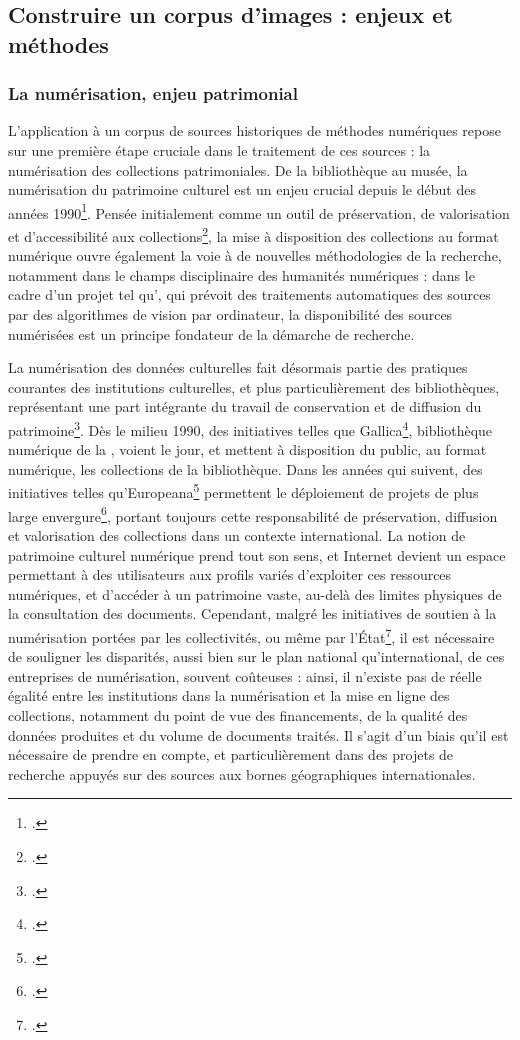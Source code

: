 
\subsection{Construire un corpus d’images : enjeux et méthodes}
    \subsubsection{La numérisation, enjeu patrimonial}
	L'application à un corpus de sources historiques de méthodes numériques repose sur une première étape cruciale dans le traitement de ces sources : la numérisation des collections patrimoniales. De la bibliothèque au musée, la numérisation du patrimoine culturel est un enjeu crucial depuis le début des années 1990\footcite{baujardNumerisationPatrimoineCulturel2017}. Pensée initialement comme un outil de préservation, de valorisation et d'accessibilité aux collections\footcite{richardProgrammeNumerisationBibliotheque1993}, la mise à disposition des collections au format numérique ouvre également la voie à de nouvelles méthodologies de la recherche, notamment dans le champs disciplinaire des humanités numériques : dans le cadre d'un projet tel qu'\eida, qui prévoit des traitements automatiques des sources par des algorithmes de vision par ordinateur, la disponibilité des sources numérisées est un principe fondateur de la démarche de recherche. 
	
	La numérisation des données culturelles fait désormais partie des pratiques courantes des institutions culturelles, et plus particulièrement des bibliothèques, représentant une part intégrante du travail de conservation et de diffusion du patrimoine\footcite{claerrModeEmploi2017}. Dès le milieu 1990, des initiatives telles que Gallica\footcite{Gallica}, bibliothèque numérique de la \bnf, voient le jour, et mettent à disposition du public, au format numérique, les collections de la bibliothèque. Dans les années qui suivent, des initiatives telles qu'Europeana\footcite{Europeana} permettent le déploiement de projets de plus large envergure\footcite{claerrModeEmploi2017}, portant toujours cette responsabilité de préservation, diffusion et valorisation des collections dans un contexte international. La notion de patrimoine culturel numérique prend tout son sens, et Internet devient un espace permettant à des utilisateurs aux profils variés d'exploiter ces ressources numériques, et d'accéder à un patrimoine vaste, au-delà des limites physiques de la consultation des documents. Cependant, malgré les initiatives de soutien à la numérisation portées par les collectivités, ou même par l'État\footcite{claerrModeEmploi2017}, il est nécessaire de souligner les disparités, aussi bien sur le plan national qu'international, de ces entreprises de numérisation, souvent coûteuses : ainsi, il n'existe pas de réelle égalité entre les institutions dans la numérisation et la mise en ligne des collections, notamment du point de vue des financements, de la qualité des données produites et du volume de documents traités. Il s'agit d'un biais qu'il est nécessaire de prendre en compte, et particulièrement dans des projets de recherche appuyés sur des sources aux bornes géographiques internationales. 
	
